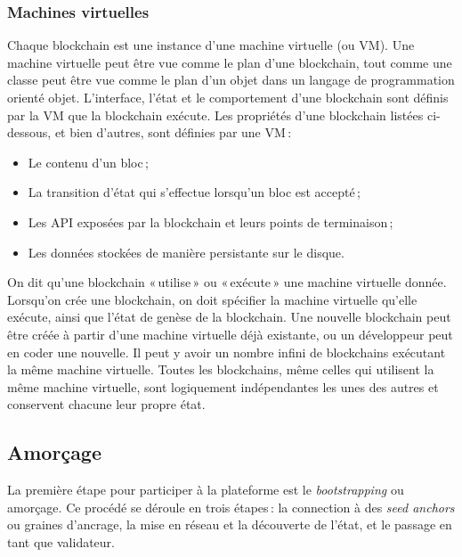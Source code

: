 \documentclass[runningheads,francais,a4paper]{llncs}
\begin{document}
\subsubsection{Machines virtuelles}
Chaque blockchain est une instance d'une machine virtuelle (ou VM). Une machine virtuelle peut être vue comme le plan d'une
blockchain, tout comme une classe peut être vue comme le plan d'un objet dans un langage de programmation orienté objet.
L'interface, l'état et le comportement d'une blockchain sont définis par la VM que la blockchain exécute. Les propriétés
d'une blockchain listées ci-dessous, et bien d'autres, sont définies par une VM\,:
\begin{itemize}
\item Le contenu d'un bloc\,;
\item La transition d'état qui s'effectue lorsqu'un bloc est accepté\,;
\item Les API exposées par la blockchain et leurs points de terminaison\,;
\item Les données stockées de manière persistante sur le disque.
\end{itemize}

On dit qu'une blockchain «\,utilise\,» ou «\,exécute\,» une machine virtuelle donnée. Lorsqu'on crée une blockchain, on
doit spécifier la machine virtuelle qu'elle exécute, ainsi que l'état de genèse de la blockchain. Une nouvelle
blockchain peut être créée à partir d'une machine virtuelle déjà existante, ou un développeur peut en coder une
nouvelle. Il peut y avoir un nombre infini de blockchains exécutant la même machine virtuelle. Toutes les blockchains,
même celles qui utilisent la même machine virtuelle, sont logiquement indépendantes les unes des autres et conservent
chacune leur propre état.

\subsection{Amorçage}
La première étape pour participer à la plateforme \AVAPlatformName{} est le \emph{bootstrapping} ou amorçage. Ce procédé se déroule en trois
étapes\,: la connection à des \emph{seed anchors} ou graines d'ancrage, la mise en réseau et la découverte de l'état, et le passage en tant
que validateur.
\end{document}
